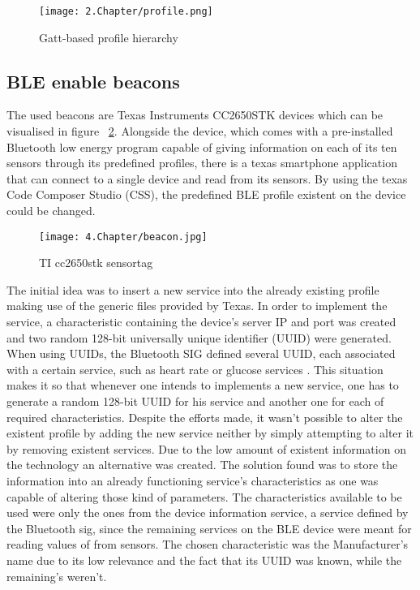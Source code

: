 \begin{figure}[H]  
\centering  
\texttt{[image: 2.Chapter/profile.png]}  
\caption[Gatt-based profile hierarchy]{Gatt-based profile hierarchy}  
\label{fig:profile}  
\end{figure}  
 
 
  
\subsection{\ac{BLE} enable beacons}  
\label{sec:ble-beacon}  
 
 
 
 
The used beacons are Texas Instruments CC2650STK devices which can be visualised in figure ~\ref{fig:beacon}. Alongside the device, which comes with a pre-installed Bluetooth low energy program capable of giving information on each of its ten sensors through its predefined profiles, there is a texas smartphone application that can connect to a single device and read from its sensors. By using the texas Code Composer Studio (CSS), the predefined \ac{BLE} profile existent on the device could be changed.  
 
 
 \begin{figure} [H] 
\centering  
\texttt{[image: 4.Chapter/beacon.jpg]}  
\caption[TI cc2650stk sensortag]{TI cc2650stk sensortag}  
\label{fig:beacon}  
\end{figure}  
 
 
The initial idea was to insert a new service into the already existing profile making use of the generic files provided by Texas.   
In order to implement the service, a characteristic containing the device's server IP and port was created and two random 128-bit universally unique identifier (UUID) were generated. When using UUIDs, the Bluetooth SIG defined several UUID, each associated with a certain service, such as heart rate or glucose services \cite{bleservices}. This situation makes it so that whenever one intends to implements a new service, one has to generate a random 128-bit UUID for his service and another one for each of required characteristics.  
Despite the efforts made, it wasn't possible to alter the existent profile by adding the new service neither by simply attempting to alter it by removing existent services. Due to the low amount of existent information on the technology an alternative was created. The solution found was to store the information into an already functioning service's characteristics as one was capable of altering those kind of parameters. The characteristics available to be used were only the ones from the device information service, a service defined by the Bluetooth sig, since the remaining services on the \ac{BLE} device were meant for reading values of from sensors. The chosen characteristic was the Manufacturer's name due to its low relevance and the fact that its UUID was known, while the remaining's weren't.  
  
